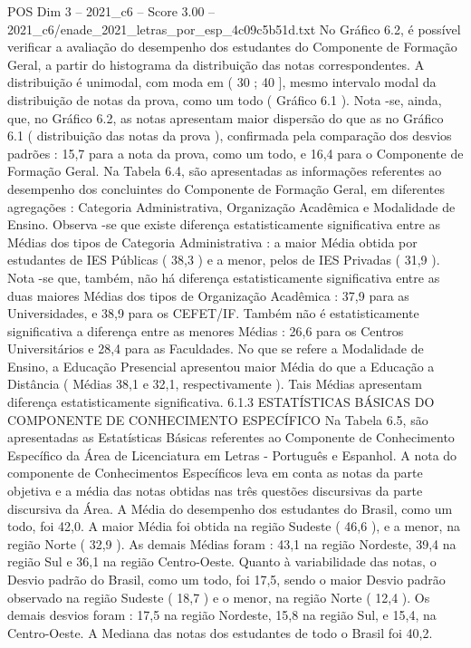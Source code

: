 \begin{textsample}{POS Dim 3 – 2021\_c6 – Score 3.00 – 2021\_c6/enade\_2021\_letras\_por\_esp\_4c09c5b51d.txt}
No Gráfico 6.2, é possível verificar a avaliação do desempenho dos estudantes do Componente de Formação Geral, a partir do histograma da distribuição das notas correspondentes.
A distribuição é unimodal, com moda em ( 30 ; 40 ], mesmo intervalo modal da distribuição de notas da prova, como um todo ( Gráfico 6.1 ).
Nota -se, ainda, que, no Gráfico 6.2, as notas apresentam maior dispersão do que as no Gráfico 6.1 ( distribuição das notas da prova ), confirmada pela comparação dos desvios padrões : 15,7 para a nota da prova, como um todo, e 16,4 para o Componente de Formação Geral.
Na Tabela 6.4, são apresentadas as informações referentes ao desempenho dos concluintes do Componente de Formação Geral, em diferentes agregações : Categoria Administrativa, Organização Acadêmica e Modalidade de Ensino.
Observa -se que existe diferença estatisticamente significativa entre as Médias dos tipos de Categoria Administrativa : a maior Média obtida por estudantes de IES Públicas ( 38,3 ) e a menor, pelos de IES Privadas ( 31,9 ).
Nota -se que, também, não há diferença estatisticamente significativa entre as duas maiores Médias dos tipos de Organização Acadêmica : 37,9 para as Universidades, e 38,9 para os CEFET/IF.
Também não é estatisticamente significativa a diferença entre as menores Médias : 26,6 para os Centros Universitários e 28,4 para as Faculdades.
No que se refere a Modalidade de Ensino, a Educação Presencial apresentou maior Média do que a Educação a Distância ( Médias 38,1 e 32,1, respectivamente ).
Tais Médias apresentam diferença estatisticamente significativa. 6.1.3 ESTATÍSTICAS BÁSICAS DO COMPONENTE DE CONHECIMENTO ESPECÍFICO Na Tabela 6.5, são apresentadas as Estatísticas Básicas referentes ao Componente de Conhecimento Específico da Área de Licenciatura em Letras - Português e Espanhol.
A nota do componente de Conhecimentos Específicos leva em conta as notas da parte objetiva e a média das notas obtidas nas três questões discursivas da parte discursiva da Área.
A Média do desempenho dos estudantes do Brasil, como um todo, foi 42,0.
A maior Média foi obtida na região Sudeste ( 46,6 ), e a menor, na região Norte ( 32,9 ).
As demais Médias foram : 43,1 na região Nordeste, 39,4 na região Sul e 36,1 na região Centro-Oeste.
Quanto à variabilidade das notas, o Desvio padrão do Brasil, como um todo, foi 17,5, sendo o maior Desvio padrão observado na região Sudeste ( 18,7 ) e o menor, na região Norte ( 12,4 ).
Os demais desvios foram : 17,5 na região Nordeste, 15,8 na região Sul, e 15,4, na Centro-Oeste.
A Mediana das notas dos estudantes de todo o Brasil foi 40,2.

\end{textsample}
